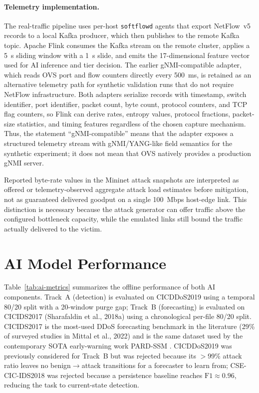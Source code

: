 \paragraph{Telemetry implementation.}
The real-traffic pipeline uses per-host \texttt{softflowd} agents that
export NetFlow~v5 records to a local Kafka producer, which then publishes
to the remote Kafka topic. Apache Flink consumes the Kafka stream on the
remote cluster, applies a 5~s sliding window with a 1~s slide, and emits
the 17-dimensional feature vector used for AI inference and tier decision.
The earlier gNMI-compatible adapter, which reads OVS port and flow
counters directly every 500~ms, is retained as an alternative telemetry
path for synthetic validation runs that do not require NetFlow
infrastructure. Both adapters serialize records with timestamp, switch
identifier, port identifier, packet count, byte count, protocol counters,
and TCP flag counters, so Flink can derive rates, entropy values, protocol
fractions, packet-size statistics, and timing features regardless of the
chosen capture mechanism. Thus, the statement ``gNMI-compatible'' means
that the adapter exposes a structured telemetry stream with gNMI/YANG-like
field semantics for the synthetic experiment; it does not mean that OVS
natively provides a production gNMI server.

Reported byte-rate values in the Mininet attack snapshots are interpreted as
offered or telemetry-observed aggregate attack load estimates before
mitigation, not as guaranteed delivered goodput on a single 100~Mbps host-edge
link. This distinction is necessary because the attack generator can offer
traffic above the configured bottleneck capacity, while the emulated links
still bound the traffic actually delivered to the victim.

\section{AI Model Performance}
\label{sec:metrics}

Table~\ref{tab:ai-metrics} summarizes the offline performance of both AI
components. Track~A (detection) is evaluated on CICDDoS2019 using a temporal
80/20 split with a 20-window purge gap; Track~B (forecasting) is evaluated on
CICIDS2017 (Sharafaldin et al., 2018a) using a chronological per-file 80/20
split. CICIDS2017 is the most-used DDoS forecasting benchmark in the
literature (29\% of surveyed studies in Mittal et al., 2022) and is the same
dataset used by the contemporary SOTA early-warning work PARD-SSM
\cite{hiremath2026pardssm}. CICDDoS2019 was previously considered for Track~B
but was rejected because its $>$99\% attack ratio leaves no
benign$\rightarrow$attack transitions for a forecaster to learn from; CSE-CIC-IDS2018
was rejected because a persistence baseline reaches $\text{F1}\approx 0.96$,
reducing the task to current-state detection.

